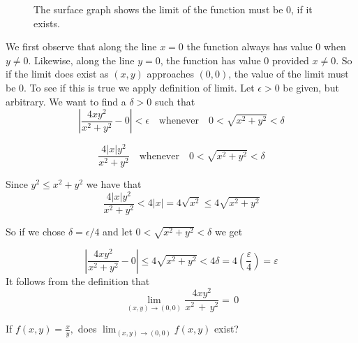 \documentclass[12pt,a4paper,draft]{article}
\begin{document}
\begin{solution}

    \begin{figure}[h]
        \centering
        \caption{The surface graph shows the limit of the function must be 0, if it exists.}
    \end{figure}
        
    We first observe  that along the line \(x=0\) the function always has value 0 when \(y \neq 0\).
    Likewise, along the line \(y=0\), the function has value 0 provided \(x \neq 0\).
    So if the limit does exist as \((x,y)\) approaches \((0,0)\), the value of the limit must be 0. To see if this is true we apply definition of limit.
    Let \(\epsilon > 0\) be given, but arbitrary. We want to find a \(\delta > 0\) such that
    \[\left|{\frac{4x y^{2}}{x^{2}+y^{2}}}-0\right|<\epsilon \quad \text{whenever} \quad  0 < \sqrt{x^2 + y^2} < \delta\]

    \[\frac{4|x|y^{2}}{x^{2}+y^{2}} \quad \text{whenever} \quad  0 < \sqrt{x^2 + y^2} < \delta   \]

    Since \(y^2 \leq x^2 + y^2\) we have that 
    \[\frac{4|x|y^{2}}{x^{2}+y^{2}} < 4|x| = 4 \sqrt{x^2} \leq 4\sqrt{x^2 + y^2}\]

    So if we chose \(\delta = \epsilon \slash 4\) and let \(0 < \sqrt{x^2 + y^2} < \delta\) we get

    \[\left|\frac{4 x y^2}{x^2+y^2}-0\right| \leq 4 \sqrt{x^2+y^2}<4 \delta=4\left(\frac{\varepsilon}{4}\right)=\varepsilon\]
    It follows from the definition that
    \[\operatorname*{lim}_{(x,y)\rightarrow(0,0)}\frac{4x y^{2}}{x^{2}\,+\,y^{2}}=\,0\]


\end{solution}

\newpage

\begin{example}
    If \(f(x,y) = \frac{x}{y},\) does \( \lim_{(x,y) \to (0,0)}f(x,y)\)  exist?
\end{example}
\end{document}
